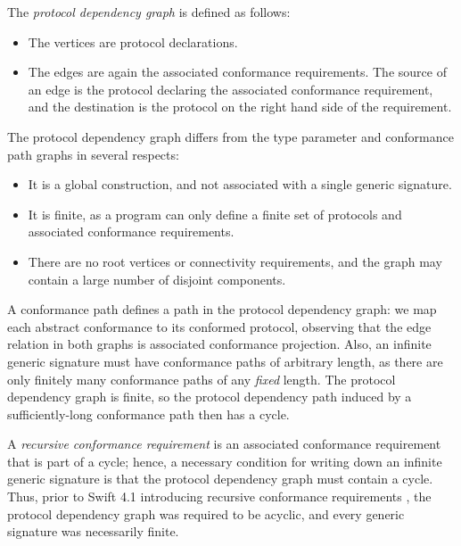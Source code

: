 \documentclass[../generics]{subfiles}
\begin{document}
\begin{definition}
The \emph{protocol dependency graph} is defined as follows:
\begin{itemize}
\item The vertices are protocol declarations.
\item The edges are again the associated conformance requirements. The source of an edge is the protocol declaring the associated conformance requirement, and the destination is the protocol on the right hand side of the requirement.
\end{itemize}
\end{definition}
The protocol dependency graph differs from the type parameter and conformance path graphs in several respects:
\begin{itemize}
\item It is a global construction, and not associated with a single generic signature.
\item It is finite, as a program can only define a finite set of protocols and associated conformance requirements.
\item There are no root vertices or connectivity requirements, and the graph may contain a large number of disjoint components.
\end{itemize}

A conformance path defines a path in the protocol dependency graph: we map each abstract conformance to its conformed protocol, observing that the edge relation in both graphs is associated conformance projection. Also, an infinite generic signature must have conformance paths of arbitrary length, as there are only finitely many conformance paths of any \emph{fixed} length. The protocol dependency graph is finite, so the protocol dependency path induced by a sufficiently-long conformance path then has a cycle.

A \emph{recursive conformance requirement} is an associated conformance requirement that is part of a cycle; hence, a necessary condition for writing down an infinite generic signature is that the protocol dependency graph must contain a cycle. Thus, prior to Swift 4.1 introducing recursive conformance requirements \cite{se0157}, the protocol dependency graph was required to be acyclic, and every generic signature was necessarily finite.
\end{document}
